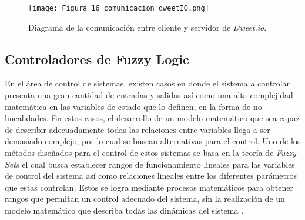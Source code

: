 \begin{figure}[H]
	\centering
	\texttt{[image: Figura\_16\_comunicacion\_dweetIO.png]}
	\caption{Diagrama de la comunicación entre cliente y servidor de \textit{Dweet.io}.}
	\label{fig:mesh16}
\end{figure}

\subsection{Controladores de Fuzzy Logic}
En el área de control de sistemas, existen casos en donde el sistema a controlar presenta una gran cantidad de entradas y salidas así como una alta complejidad matemática en las variables de estado que lo definen, en la forma de no linealidades. En estos casos, el desarrollo de un modelo matemático que sea capaz de describir adecuadamente todas las relaciones entre variables llega a ser demasiado complejo, por lo cual se buscan alternativas para el control. Uno de los métodos diseñados para el control de estos sistemas se basa en la teoría de \textit{Fuzzy Sets} el cual busca establecer rangos de funcionamiento lineales para las variables de control del sistema así como relaciones lineales entre los diferentes parámetros que estas controlan. Estos se logra mediante procesos matemáticos para obtener rangos que permitan un control adecuado del sistema, sin la realización de un modelo matemático que describa todas las dinámicas del sistema \cite{verbruggen_fuzzy_1999}.



